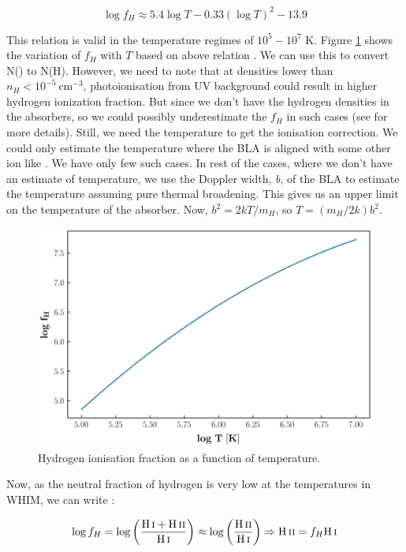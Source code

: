 \begin{equation} 
    \log f_H \approx 5.4 \log T - 0.33(\log T)^2 -13.9
\end{equation}

This relation is valid in the temperature regimes of $10^5-10^7$ K. Figure \ref{fig:fH} shows the variation of $f_H$ with $T$ based on above relation . We can use this to convert N() to N(H). However, we need to note that at densities lower than $n_H < 10^{-5} \ \text{cm}^{-3}$, photoionisation from UV background could result in higher hydrogen ionization fraction. But since we don't have the hydrogen densities in the absorbers, so we could possibly underestimate the $f_H$ in such cases (see \citet{Richter_2020, Fang-2001} for more details). Still, we need the temperature to get the ionisation correction. We could only estimate the temperature where the BLA is aligned with some other ion like . We have only few such cases. In rest of the cases, where we don't have an estimate of temperature, we use the Doppler width, \emph{b}, of the BLA to estimate the temperature assuming pure thermal broadening. This gives us an upper limit on the temperature of the absorber. Now, $b^2=2kT/m_H$, so $T=(m_H / 2k) b^2 $. 

\begin{figure}[t]
    \centering
    \includegraphics[width=\linewidth]{Figures/fH_vs_T.png}
    \caption{Hydrogen ionisation fraction as a function of temperature.}
    \label{fig:fH}
\end{figure}

Now, as the neutral fraction of hydrogen is very low at the temperatures in WHIM, we can write :

\begin{equation*}
     \log f_H = \log \left(\frac{\ion{H}{i}+\ion{H}{ii}}{\ion{H}{i}}\right) \approx \log \left(\frac{\ion{H}{ii}}{\ion{H}{i}}\right)  \Rightarrow  \ion{H}{ii}= f_H \ion{H}{i}
\end{equation*}


